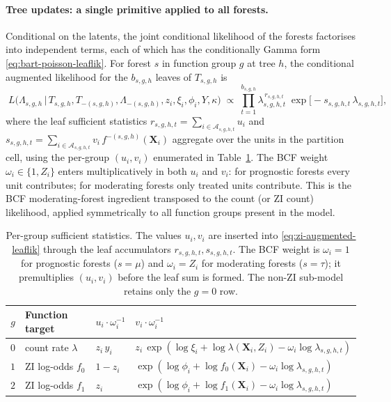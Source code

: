 \documentclass[11pt]{article}
\theoremstyle{plain}
\theoremstyle{definition}
\theoremstyle{remark}
\newcommand{\X}{\mathbf{X}}
\newcommand{\fzeroSym}{f_{0}}
\newcommand{\foneSym}{f_{1}}
\newcommand{\zilat}{z_{i}}
\newcommand{\xilat}{\xi_{i}}
\newcommand{\philat}{\phi_{i}}
\newcommand{\omegai}{\omega_{i}}
\begin{document}
\paragraph{Tree updates: a single primitive applied to all forests.}
Conditional on the latents, the joint conditional likelihood of the
forests factorises into independent terms, each of which has the
conditionally Gamma form \eqref{eq:bart-poisson-leaflik}. For forest
$s$ in function group $g$ at tree $h$, the conditional augmented
likelihood for the $b_{s,g,h}$ leaves of $T_{s,g,h}$ is
\begin{equation}
  \boxed{\;
    L\bigl(\Lambda_{s,g,h} \,\big|\, T_{s,g,h}, T_{-(s,g,h)},
           \Lambda_{-(s,g,h)},
           \zilat, \xilat, \philat, Y, \kappa\bigr)
    \;\propto\;
    \prod_{t=1}^{b_{s,g,h}}
      \lambda_{s,g,h,t}^{\,r_{s,g,h,t}}\;
      \exp\!\bigl[-s_{s,g,h,t}\,\lambda_{s,g,h,t}\bigr],
  \;}
  \label{eq:zi-augmented-leaflik}
\end{equation}
where the leaf sufficient statistics
$r_{s,g,h,t} = \sum_{i \in \mathcal{A}_{s,g,h,t}} u_i$ and
$s_{s,g,h,t} = \sum_{i \in \mathcal{A}_{s,g,h,t}}
v_i\, f^{-(s,g,h)}(\X_i)$ aggregate over the units in the partition
cell, using the per-group $(u_i, v_i)$ enumerated in
Table~\ref{tab:suffstats}. The BCF weight $\omegai \in \{1, Z_i\}$
enters multiplicatively in both $u_i$ and $v_i$: for prognostic
forests every unit contributes; for moderating forests only treated
units contribute. This is the BCF moderating-forest ingredient
transposed to the count (or ZI count) likelihood, applied
symmetrically to all function groups present in the model.

\begin{table}[t]
\centering
\caption{Per-group sufficient statistics. The values $u_i, v_i$ are
inserted into \eqref{eq:zi-augmented-leaflik} through the leaf
accumulators $r_{s,g,h,t}, s_{s,g,h,t}$. The BCF weight is
$\omegai = 1$ for prognostic forests ($s = \mu$) and $\omegai = Z_i$
for moderating forests ($s = \tau$); it premultiplies $(u_i, v_i)$
before the leaf sum is formed. The non-ZI sub-model retains only the
$g = 0$ row.}
\label{tab:suffstats}
\begin{tabular}{clll}
\toprule
$g$ & Function target          & $u_i \cdot \omegai^{-1}$ & $v_i \cdot \omegai^{-1}$ \\
\midrule
$0$ & count rate $\lambda$     & $\zilat\, y_i$
                                & $\zilat\, \exp(\log \xilat + \log\lambda(\X_i, Z_i)
                                            - \omegai \log \lambda_{s,g,h,t})$ \\
$1$ & ZI log-odds $\fzeroSym$  & $1 - \zilat$
                                & $\exp(\log \philat + \log\fzeroSym(\X_i)
                                            - \omegai \log \lambda_{s,g,h,t})$ \\
$2$ & ZI log-odds $\foneSym$   & $\zilat$
                                & $\exp(\log \philat + \log\foneSym(\X_i)
                                            - \omegai \log \lambda_{s,g,h,t})$ \\
\bottomrule
\end{tabular}
\end{table}
\end{document}
